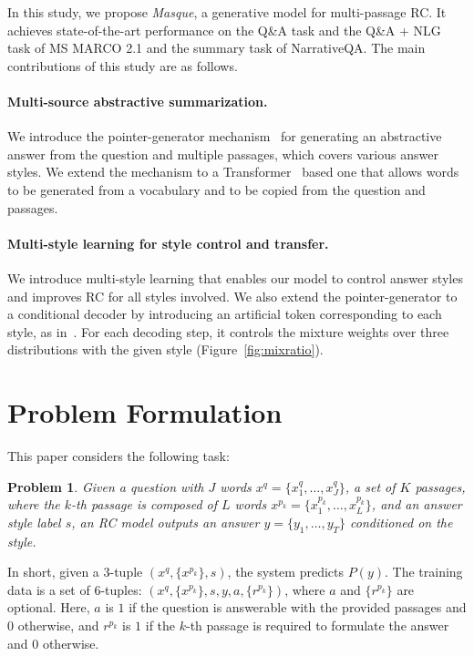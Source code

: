 \documentclass[11pt,a4paper]{article}
\theoremstyle{mydef}
\theoremstyle{myprob}
\newtheorem{problem}{Problem}
\begin{document}
In this study, we propose \textit{Masque}, a generative model for multi-passage RC. It achieves state-of-the-art performance
on the Q\&A task and the Q\&A + NLG task 
of MS MARCO 2.1 and the summary task of NarrativeQA. 
The main contributions of this study are as follows.

\paragraph{Multi-source abstractive summarization.} 

We introduce the pointer-generator mechanism~\citep{SeeLM17}
for generating an abstractive answer from the question and multiple passages,
which covers
various answer styles.
We extend the mechanism to a Transformer~\citep{VaswaniSPUJGKP17} based one that allows words to be generated from a vocabulary and to be copied from the question and passages.

\paragraph{Multi-style learning for style control and transfer.} 
We introduce multi-style learning that enables our model to control answer styles
and improves RC
for all styles involved. 
We also extend the pointer-generator 
to a conditional decoder by introducing an artificial token corresponding to each style, as in~\citep{JohnsonSLKWCTVW17}.  For each decoding step, it controls the mixture weights over three  distributions with the given style (Figure~\ref{fig:mixratio}).

\section{Problem Formulation}
\label{sec:problem}

This paper considers the following task:
\begin{problem}
\label{prob:prob}
Given a question with $J$ words $x^q = \{x^q_1, \ldots, x^q_J\}$, a set of $K$ passages, where the $k$-th passage is composed of $L$ words $x^{p_k} = \{x^{p_k}_1, \ldots, x^{p_k}_{L}\}$, and an answer style label $s$, an RC model outputs an answer $y = \{y_1, \ldots, y_T \}$ conditioned on the style.
\end{problem}
In short, %
given a 3-tuple $(x^q, \{x^{p_k}\}, s)$, the system predicts $P(y)$.
The training data is a set of 6-tuples: $(x^q, \{x^{p_k}\}, s, y, a, \{r^{p_k}\})$, where $a$ and $\{r^{p_k}\}$ are optional.
Here, $a$ is $1$ if the question is answerable with the provided passages and $0$ otherwise, and 
$r^{p_k}$ is $1$ if the $k$-th passage is required to formulate the answer and $0$ otherwise.
\end{document}
